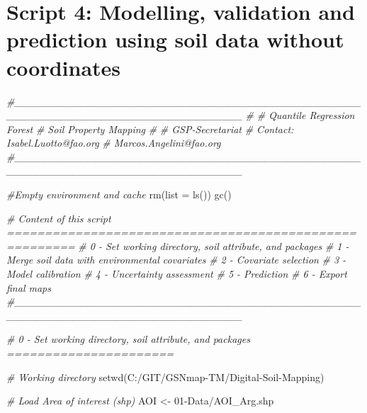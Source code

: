 \documentclass[
  10pt,
  b5paper,
  oneside]{book}
\newenvironment{Shaded}{\begin{snugshade}}{\end{snugshade}}
\newcommand{\AttributeTok}[1]{\textcolor[rgb]{0.77,0.63,0.00}{#1}}
\newcommand{\CommentTok}[1]{\textcolor[rgb]{0.56,0.35,0.01}{\textit{#1}}}
\newcommand{\FunctionTok}[1]{\textcolor[rgb]{0.00,0.00,0.00}{#1}}
\newcommand{\NormalTok}[1]{#1}
\newcommand{\OtherTok}[1]{\textcolor[rgb]{0.56,0.35,0.01}{#1}}
\newcommand{\StringTok}[1]{\textcolor[rgb]{0.31,0.60,0.02}{#1}}
\begin{document}
\hypertarget{script-4-modelling-validation-and-prediction-using-soil-data-without-coordinates}{%
\section*{Script 4: Modelling, validation and prediction using soil data without coordinates}\label{script-4-modelling-validation-and-prediction-using-soil-data-without-coordinates}}

\begin{Shaded}
\begin{Highlighting}[]
\CommentTok{\#\_\_\_\_\_\_\_\_\_\_\_\_\_\_\_\_\_\_\_\_\_\_\_\_\_\_\_\_\_\_\_\_\_\_\_\_\_\_\_\_\_\_\_\_\_\_\_\_\_\_\_\_\_\_\_\_\_\_\_\_\_\_\_\_\_\_\_\_\_\_\_\_\_\_\_\_\_\_\_}
\CommentTok{\#}
\CommentTok{\# Quantile Regression Forest}
\CommentTok{\# Soil Property Mapping}
\CommentTok{\#}
\CommentTok{\# GSP{-}Secretariat}
\CommentTok{\# Contact: Isabel.Luotto@fao.org}
\CommentTok{\#          Marcos.Angelini@fao.org}
\CommentTok{\#\_\_\_\_\_\_\_\_\_\_\_\_\_\_\_\_\_\_\_\_\_\_\_\_\_\_\_\_\_\_\_\_\_\_\_\_\_\_\_\_\_\_\_\_\_\_\_\_\_\_\_\_\_\_\_\_\_\_\_\_\_\_\_\_\_\_\_\_\_\_\_\_\_\_\_\_\_\_\_}

\CommentTok{\#Empty environment and cache }
\FunctionTok{rm}\NormalTok{(}\AttributeTok{list =} \FunctionTok{ls}\NormalTok{())}
\FunctionTok{gc}\NormalTok{()}

\CommentTok{\# Content of this script =======================================================}
\CommentTok{\# 0 {-} Set working directory, soil attribute, and packages}
\CommentTok{\# 1 {-} Merge soil data with environmental covariates }
\CommentTok{\# 2 {-} Covariate selection}
\CommentTok{\# 3 {-} Model calibration}
\CommentTok{\# 4 {-} Uncertainty assessment}
\CommentTok{\# 5 {-} Prediction}
\CommentTok{\# 6 {-} Export final maps}
\CommentTok{\#\_\_\_\_\_\_\_\_\_\_\_\_\_\_\_\_\_\_\_\_\_\_\_\_\_\_\_\_\_\_\_\_\_\_\_\_\_\_\_\_\_\_\_\_\_\_\_\_\_\_\_\_\_\_\_\_\_\_\_\_\_\_\_\_\_\_\_\_\_\_\_\_\_\_\_\_\_\_\_}


\CommentTok{\# 0 {-} Set working directory, soil attribute, and packages ======================}

\CommentTok{\# Working directory}
\FunctionTok{setwd}\NormalTok{(}\StringTok{\textquotesingle{}C:/GIT/GSNmap{-}TM/Digital{-}Soil{-}Mapping\textquotesingle{}}\NormalTok{)}

\CommentTok{\# Load Area of interest (shp)}
\NormalTok{AOI }\OtherTok{\textless{}{-}} \StringTok{\textquotesingle{}01{-}Data/AOI\_Arg.shp\textquotesingle{}}


\end{Highlighting}
\end{Shaded}
\end{document}
